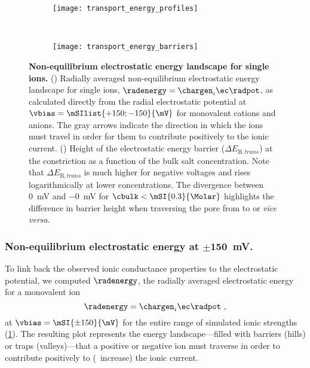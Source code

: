 %
\begin{figure}[p]
  \centering
  
  \begin{subfigure}[t]{11cm}
    \centering
    \caption{}\vspace{-5mm}\label{fig:transport_energy_profiles}
    \texttt{[image: transport\_energy\_profiles]}
  \end{subfigure}
  \\
  \begin{subfigure}[t]{9cm}
    \centering
    \caption{}\vspace{-3mm}\label{fig:transport_energy_barriers}
    \texttt{[image: transport\_energy\_barriers]}
  \end{subfigure}

  \caption[Non-equilibrium electrostatic energy landscape for single ions]%
  {%
    \textbf{Non-equilibrium electrostatic energy landscape for single ions.}
    ()
    Radially averaged non-equilibrium electrostatic energy landscape for single ions, $\radenergy =
    \chargen_{i} \ec \radpot$, as calculated directly from the radial electrostatic potential at $\vbias
    = \mSIlist{+150;-150}{\mV}$ for monovalent cations and anions. The gray arrows indicate the direction in
    which the ions must travel in order for them to contribute positively to the ionic current.
    ()
    Height of the electrostatic energy barrier ($\Delta E_{\text{B},\mathit{trans}}$) at the \transi{}
    constriction as a function of the bulk salt concentration. Note that $\Delta E_{\text{B},\mathit{trans}}$
    is much higher for negative voltages and rises logarithmically at lower concentrations. The divergence
    between \SI{+0}{\mV} and \SI{-0}{\mV} for $\cbulk < \mSI{0.3}{\Molar}$ highlights the difference in
    barrier height when traversing the pore from \cisi{} to \transi{} or \textit{vice versa}.
  }\label{fig:transport_energy}
\end{figure}
%

\subsubsection{Non-equilibrium electrostatic energy at $\mathbf{\pm150}$~mV.}
%

To link back the observed ionic conductance properties to the electrostatic potential, we computed
$\radenergy$, the radially averaged electrostatic energy for a monovalent ion
%
\begin{equation}\label{eq:epnp-ns_radenergy}
  \radenergy = \chargen_{i} \ec \radpot
  \text{ ,}
\end{equation}
%
at $\vbias = \mSI{\pm150}{\mV}$ for the entire range of simulated ionic strengths
(\cref{fig:transport_energy_profiles}). The resulting plot represents the energy landscape---filled with
barriers (hills) or traps (valleys)---that a positive or negative ion must traverse in order to contribute
positively to (\ie~increase) the ionic current.


